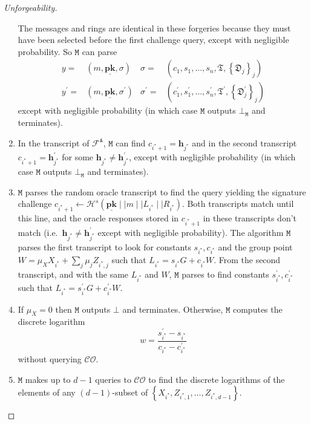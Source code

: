 \documentclass[draft]{llncs} %
\begin{document}
\begin{proof}[Unforgeability]
\begin{enumerate}
The messages and rings are identical in these forgeries because they must have been selected before the first challenge query, except with negligible probability. So $\texttt{M}$ can parse
\begin{align*}
y =& (m, \underline{\textbf{pk}}, \sigma) & \sigma =& (c_1, s_1, \ldots, s_n, \mathfrak{T}, \left\{\mathfrak{D}_j\right\}_j) \\
y^\prime =& (m, \underline{\textbf{pk}}, \sigma^\prime) & \sigma^\prime =& (c_1^\prime, s_1^\prime, \ldots, s_n^\prime, \mathfrak{T}^\prime, \left\{\mathfrak{D}_j^\prime\right\}_j)\end{align*} except with negligible probability (in which case $\texttt{M}$ outputs $\bot_{\texttt{M}}$ and terminates).

\item In the transcript of $\mathcal{F}^{\texttt{A}}$, $\texttt{M}$ can find $c_{i^*+1} = \textbf{h}_{j^*}$ and in the second transcript $c_{i^*+1} = \textbf{h}^\prime_{j^*}$ for some $\textbf{h}_{j^*} \neq \textbf{h}^\prime_{j^*}$, except with negligible probability (in which case $\texttt{M}$ outputs $\bot_{\texttt{M}}$ and terminates).

\item $\texttt{M}$ parses the random oracle transcript to find the query yielding the signature challenge  $c_{i^*+1} \leftarrow \mathcal{H}^s(\underline{\textbf{pk}} \mid \mid m \mid \mid L_{i^*} \mid \mid R_{i^*})$. Both transcripts match until this line, and the oracle responses stored in $c_{i^*+1}$ in these transcripts don't match (i.e.\ $\textbf{h}_{j^*} \neq \textbf{h}^\prime_{j^*}$ except with negligible probability). The algorithm  $\texttt{M}$ parses the first transcript to look for constants $s_{i^*}, c_{i^*}$ and the group point $W = \mu_X X_{i^*} + \sum_j \mu_j Z_{i^*, j}$ such that $L_{i^*} = s_{i^*} G + c_{i^*} W$. From the second transcript, and with the same $L_{i^*}$ and $W$, $\texttt{M}$ parses to find constants $s_{i^*}^\prime, c_{i^*}^\prime$ such that $L_{i^*} = s_{i^*}^\prime G + c_{i^*}^\prime W$.

\item If $\mu_X = 0$ then $\texttt{M}$ outputs $\bot$ and terminates. Otherwise, $\texttt{M}$ computes the discrete logarithm
$$w = \frac{s_{i^*}^\prime - s_{i^*}}{c_{i^*} - c_{i^*}^\prime}$$ without querying $\mathcal{CO}$.

\item $\texttt{M}$ makes up to $d-1$ queries to $\mathcal{CO}$ to find the discrete logarithms of the elements of any $(d-1)$-subset of $\left\{X_{i^*}, Z_{i^*, 1}, \ldots, Z_{i^*, d-1}\right\}$.


\end{enumerate}
\end{proof}
\end{document}
